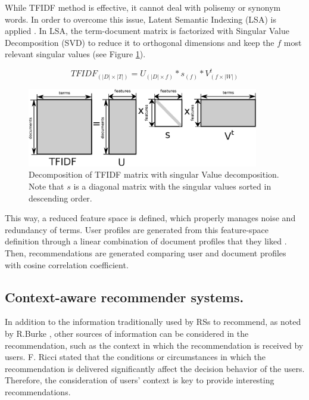 \documentclass[preprint]{elsarticle}
\begin{document}
\begin{spacing}{1.5}
While TFIDF method is effective, it cannot deal with polisemy or synonym words. In order to overcome this issue, Latent Semantic Indexing (LSA) is applied \cite{deGemmis2015}. In LSA, the term-document matrix is factorized with Singular Value Decomposition (SVD) to reduce it to orthogonal dimensions and keep the $f$ most relevant singular values (see Figure \ref{fig:svd-scheme}).

\begin{equation}
	TFIDF_{(|D|\times|T|)} = U_{(|D|\times f)} * s_{(f)} * V^t_{(f \times |W|)}
	\label{eq:svd}
\end{equation}

\begin{figure}[h]
	\centering
	\includegraphics[width=0.9\textwidth]{figures/svd-scheme.eps}
	\caption{Decomposition of TFIDF matrix with singular Value decomposition. Note that $s$ is a diagonal matrix with the singular values sorted in descending order.}
	\label{fig:svd-scheme}
\end{figure}

This way, a reduced feature space is defined, which properly manages noise and redundancy of terms. User profiles are generated from this feature-space definition through a linear combination of document profiles that they liked \cite{Bambini2011}. Then, recommendations are generated comparing user and document profiles with cosine correlation coefficient.

\subsection{Context-aware recommender systems.}

In addition to the information traditionally used by RSs to recommend, as noted by R.Burke \cite{Burke2002}, other sources of information can be considered in the recommendation, such as the context in which the recommendation is received by users. F. Ricci \cite{Ricci2012contextualizing} stated that the conditions or circumstances in which the recommendation is delivered significantly affect the decision behavior of the users. Therefore, the consideration of users' context is key to provide interesting recommendations.


\end{spacing}
\end{document}
